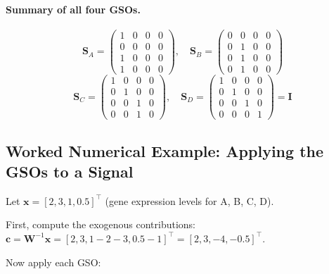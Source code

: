 \paragraph{Summary of all four GSOs.}
\[
    \mathbf{S}_A = \begin{pmatrix}1&0&0&0\\0&0&0&0\\1&0&0&0\\1&0&0&0\end{pmatrix}, \quad
    \mathbf{S}_B = \begin{pmatrix}0&0&0&0\\0&1&0&0\\0&1&0&0\\0&1&0&0\end{pmatrix}
\]
\[
    \mathbf{S}_C = \begin{pmatrix}1&0&0&0\\0&1&0&0\\0&0&1&0\\0&0&1&0\end{pmatrix}, \quad
    \mathbf{S}_D = \begin{pmatrix}1&0&0&0\\0&1&0&0\\0&0&1&0\\0&0&0&1\end{pmatrix} = \mathbf{I}
\]

\subsection{Worked Numerical Example: Applying the GSOs to a Signal}

Let $\mathbf{x} = [2, 3, 1, 0.5]^\top$ (gene expression levels for A, B, C, D).

First, compute the exogenous contributions:
$\mathbf{c} = \mathbf{W}^{-1}\mathbf{x} = [2, 3, 1-2-3, 0.5-1]^\top = [2, 3, -4, -0.5]^\top$.

Now apply each GSO:

